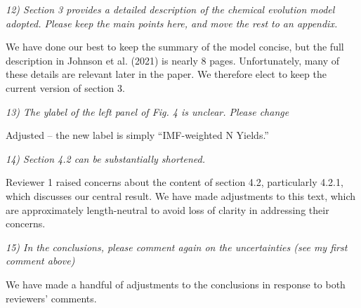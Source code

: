 \documentclass[12pt]{article}
\newcommand\doublebreak[0]{\par\null\par\noindent}
\begin{document}
\doublebreak
\textit{%
12) Section 3 provides a detailed description of the chemical evolution model
adopted.
Please keep the main points here, and move the rest to an appendix.
}
\doublebreak
We have done our best to keep the summary of the model concise, but the full
description in Johnson et al. (2021) is nearly 8 pages.
Unfortunately, many of these details are relevant later in the paper.
We therefore elect to keep the current version of section 3.
\doublebreak
\textit{%
13) The ylabel of the left panel of Fig. 4 is unclear. Please change
}
\doublebreak
Adjusted -- the new label is simply ``IMF-weighted N Yields.''
\doublebreak
\textit{%
14) Section 4.2 can be substantially shortened.
}
\doublebreak
Reviewer 1 raised concerns about the content of section 4.2, particularly
4.2.1, which discusses our central result.
We have made adjustments to this text, which are approximately length-neutral
to avoid loss of clarity in addressing their concerns.
\doublebreak
\textit{%
15) In the conclusions, please comment again on the uncertainties (see my first
comment above)
}
\doublebreak
We have made a handful of adjustments to the conclusions in response to both
reviewers' comments.
\end{document}
